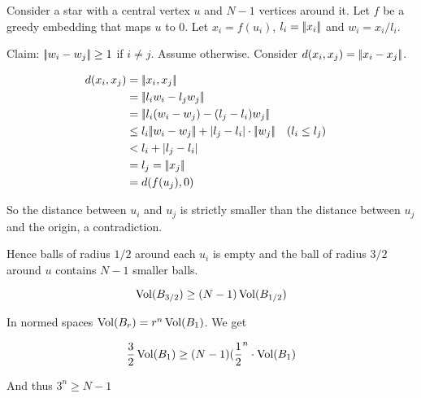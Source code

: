 \begin{pr} Consider a star with a central vertex $u$ and $N-1$ vertices around it. Let $f$ be a greedy embedding that maps $u$ to $0$. Let $x_i=f(u_i)$, $l_i=|\!|x_i|\!|$ and $w_i = x_i/l_i$.

Claim: $|\!|w_i-w_j|\!| \geq 1$ if $i\neq j$. Assume otherwise. Consider $d(x_i,x_j)=|\!|x_i-x_j|\!|$.

\begin{align*}
d(x_i,x_j)&=\norm{x_i,x_j} \\
	&=\norm{l_iw_i - l_jw_j}\\
	&=\norm{l_i(w_i-w_j) -(l_j-l_i)w_j}\\
  &\leq l_i \norm{w_i-w_j} + |l_j-l_i|\cdot \norm{w_j} && (l_i\leq l_j)\\
  &< l_i + |l_j-l_i|\\
  &=l_j = \norm{x_j}\\
  &=d(f(u_j),0)
\end{align*}

So the distance between $u_i$ and $u_j$ is strictly smaller than the distance between $u_j$ and the origin, a contradiction.

Hence balls of radius $1/2$ around each $u_i$ is empty and the ball of radius $3/2$ around $u$ contains $N-1$ smaller balls.

\[\operatorname{Vol}(B_{3/2}) \geq (N-1)\operatorname{Vol}(B_{1/2})\]

In normed spaces $\operatorname{Vol}(B_r) = r^n \operatorname{Vol}(B_1)$. We get

\[\frac 32 \operatorname{Vol}(B_1) \geq (N-1)(\frac 12^n \cdot \operatorname{Vol}(B_1)\]

And thus $3^n\geq N-1$
\end{pr}